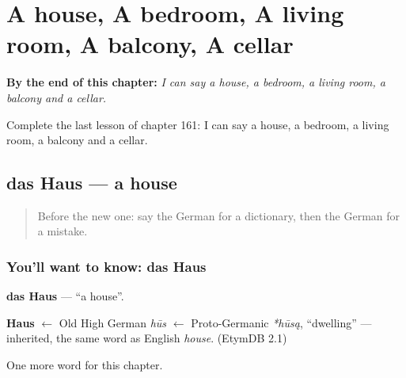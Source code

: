 
\chapter{A house, A bedroom, A living room, A balcony, A cellar}
\label{ch:ge-a-house-a-bedroom-a-living-room-a-balcony-a-cellar}

\begin{chapteropening}
\textbf{By the end of this chapter:} \emph{I can say a house, a bedroom, a living room, a balcony and a cellar.}

Complete the last lesson of chapter 161: I can say a house, a bedroom, a living room, a balcony and a cellar.
\end{chapteropening}

\section[das Haus]{das Haus — a house}

\label{lesson:GE-C161-haus}



\begin{quote}
Before the new one: say the German for a dictionary, then the German for a mistake.
\end{quote}

\subsection*{You'll want to know: das Haus}
\textbf{das Haus} — \textquotedblleft{}a house\textquotedblright{}.

\begin{cousinweb}
\textbf{Haus} $\leftarrow$ Old High German \emph{hūs} $\leftarrow$ Proto-Germanic \emph{*hūsą}, \textquotedblleft{}dwelling\textquotedblright{} — inherited, the same word as English \emph{house}. (EtymDB 2.1)
\end{cousinweb}

\begin{grammarlens}[title={What you've built}]
One more word for this chapter.
\end{grammarlens}

